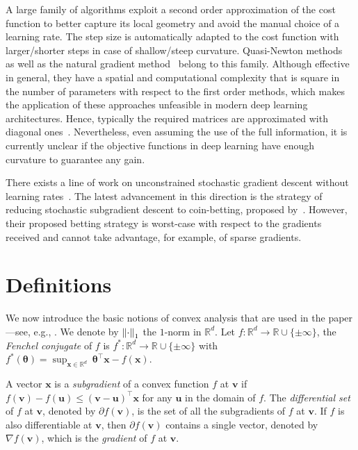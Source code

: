 \documentclass{article}
\newcommand{\bx}{\boldsymbol{x}}
\newcommand{\bu}{\boldsymbol{u}}
\newcommand{\bv}{\boldsymbol{v}}
\newcommand{\field}[1]{\mathbb{#1}}
\newcommand{\R}{\field{R}}
\newcommand{\btheta}{\boldsymbol{\theta}}
\begin{document}
A large family of algorithms exploit a second order approximation of the cost function to better
capture its local geometry and avoid the manual choice of a learning rate. The step size is automatically
adapted to the cost function with larger/shorter steps in case of shallow/steep curvature.
Quasi-Newton methods~\citep{WrightN99} as well as the natural gradient method~\citep{Amari98} belong
to this family. Although effective in general, they have a spatial and computational complexity that is square
in the number of parameters with respect to the first order methods, which makes the application
of these approaches unfeasible in modern deep learning architectures. Hence, typically the required matrices are approximated with diagonal ones~\citep{LeCunBOM98,SchaulZLC13}. Nevertheless, even assuming
the use of the full information, it is currently unclear if the objective functions in deep learning have
enough curvature to guarantee any gain.

There exists a line of work on unconstrained stochastic gradient descent without learning rates~\citep{Streeter-McMahan-2012,Orabona-2013,McMahan-Orabona-2014,Orabona-2014,CutkoskyB16,CutkoskyB17}.
The latest advancement in this direction is the strategy of reducing stochastic subgradient descent to coin-betting, proposed by~\citet{OrabonaP16b}.
However, their proposed betting strategy is worst-case with respect to the gradients received and cannot
take advantage, for example, of sparse gradients.











 \section{Definitions}
\label{sec:def}

We now introduce the basic notions of convex analysis that are used in the paper---see, e.g., \citet{Bauschke-Combettes-2011}.
We denote by $\left\|{\cdot}\right\|_1$ the $1$-norm in $\R^d$. Let $f: \R^d \to \R
\cup \{\pm\infty\}$, the \emph{Fenchel conjugate} of $f$ is $f^*:\R^d \to \R \cup \{\pm
\infty\}$ with $f^*(\btheta) = \sup_{\bx \in
\R^d} \ \btheta^\top \bx - f(\bx)$.


A vector $\bx$ is a \emph{subgradient} of a convex function $f$ at $\bv$ if $f(\bv) - f (\bu) \leq  (\bv - \bu)^\top \bx$ for any $\bu$ in the domain of $f$. The \emph{differential set} of $f$ at $\bv$, denoted by $\partial f(\bv)$, is the set of all the subgradients of $f$ at $\bv$. If $f$ is also differentiable at $\bv$, then $\partial f(\bv)$ contains a single vector, denoted by $\nabla f(\bv)$, which is the \emph{gradient} of $f$ at $\bv$.
\end{document}
